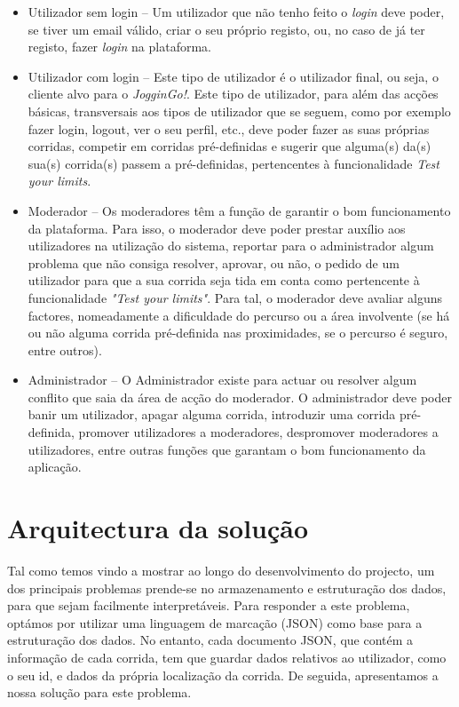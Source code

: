 \documentclass[twocolumn,twoside,10pt,a4paper]{article}
\begin{document}
\begin{itemize}
\item {Utilizador sem login} -- Um utilizador que não tenho feito o \textit{login} deve poder, se tiver um email válido, criar o seu próprio registo, ou, no caso de já ter registo, fazer \textit{login} na plataforma.
\item {Utilizador com login} -- Este tipo de utilizador é o utilizador final, ou seja, o cliente alvo para o \textit{JogginGo!}. Este tipo de utilizador, para além das acções básicas, transversais aos tipos de utilizador que se seguem, como por exemplo fazer login, logout, ver o seu perfil, etc., deve poder fazer as suas próprias corridas, competir em corridas pré-definidas e sugerir que alguma(s) da(s) sua(s) corrida(s) passem a pré-definidas, pertencentes à funcionalidade \textit{Test your limits}.
\item{Moderador} -- Os moderadores têm a função de garantir o bom funcionamento da plataforma. Para isso, o moderador deve poder prestar auxílio aos utilizadores na utilização do sistema, reportar para o administrador algum problema que não consiga resolver, aprovar, ou não, o pedido de um utilizador para que a sua corrida seja tida em conta como pertencente à funcionalidade \textit{"Test your limits"}. Para tal, o moderador deve avaliar alguns factores, nomeadamente a dificuldade do percurso ou a área involvente (se há ou não alguma corrida pré-definida nas proximidades, se o percurso é seguro, entre outros).
\item{Administrador} -- O Administrador existe para actuar ou resolver algum conflito que saia da área de acção do moderador. O administrador deve poder banir um utilizador, apagar alguma corrida, introduzir uma corrida pré-definida, promover utilizadores a moderadores, despromover moderadores a utilizadores, entre outras funções que garantam o bom funcionamento da aplicação.
\end{itemize}

\section{Arquitectura da solução}
Tal como temos vindo a mostrar ao longo do desenvolvimento do projecto, um dos principais problemas prende-se no armazenamento e estruturação dos dados, para que sejam facilmente interpretáveis. Para responder a este problema, optámos por utilizar uma linguagem de marcação (JSON) como base para a estruturação dos dados. No entanto, cada documento JSON, que contém a informação de cada corrida, tem que guardar dados relativos ao utilizador, como o seu id, e dados da própria localização da corrida. De seguida, apresentamos a nossa solução para este problema.
\end{document}
